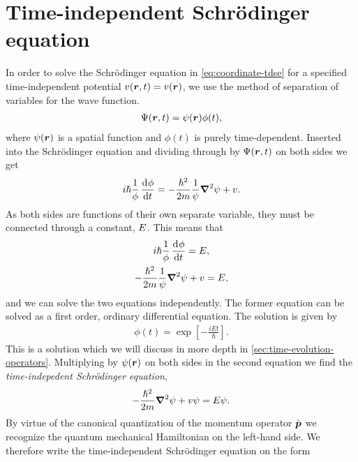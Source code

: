     \section{Time-independent Schrödinger equation}
        In order to solve the Schrödinger equation in
        \autoref{eq:coordinate-tdse} for a specified time-independent potential
        $v(\boldsymbol{r}, t) = v(\boldsymbol{r})$, we use the method of separation of
        variables for the wave function.
        \begin{align}
            \Psi(\boldsymbol{r}, t) = \psi(\boldsymbol{r})\phi(t),
        \end{align}
        where $\psi(\boldsymbol{r})$ is a spatial function and $\phi(t)$ is purely
        time-dependent.
        Inserted into the Schrödinger equation and dividing through by
        $\Psi(\boldsymbol{r}, t)$ on both sides we get
        \begin{align}
            i\hslash\frac{1}{\phi}\dod{\phi}{t}
            = -\frac{\hslash^2}{2m}\frac{1}{\psi}
            \vfg{\nabla}^2\psi + v.
        \end{align}
        As both sides are functions of their own separate variable, they must be
        connected through a constant, $E$.
        This means that
        \begin{gather}
            i\hslash\frac{1}{\phi}\dod{\phi}{t} = \energy, \\
            -\frac{\hslash^2}{2m}\frac{1}{\psi}\vfg{\nabla}^2\psi
            + v = E,
        \end{gather}
        and we can solve the two equations independently.
        The former equation can be solved as a first order, ordinary
        differential equation.
        The solution is given by
        \begin{align}
            \phi(t) = \exp[-\frac{iEt}{\hslash}].
        \end{align}
        This is a solution which we will discuss in more depth in
        \autoref{sec:time-evolution-operators}.
        Multiplying by $\psi(\boldsymbol{r})$ on both sides in the second equation we
        find the \emph{time-indepedent Schrödinger equation},
        \begin{align}
            -\frac{\hslash^2}{2m}\boldsymbol{\nabla}^2\psi + v\psi = E\psi.
        \end{align}
        By virtue of the canonical quantization of the momentum operator
        $\hat{\boldsymbol{p}}$ we recognize the quantum mechanical Hamiltonian on the
        left-hand side.
        We therefore write the time-independent Schrödinger equation on the form
